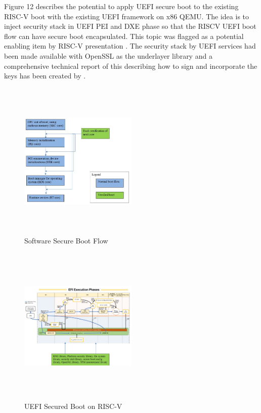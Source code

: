 \documentclass[a4paper,fleqn]{cas-dc}
\begin{document}
Figure 12 describes the potential to apply UEFI secure boot to the existing RISC-V boot with the existing UEFI framework on x86 QEMU. The idea is to inject security stack in UEFI PEI and DXE phase so that the RISCV UEFI boot flow can have secure boot encapsulated. This topic was flagged as a potential enabling item by RISC-V presentation \cite{R5:10}. The security stack by UEFI services had been made available with OpenSSL as the underlayer library and a comprehensive technical report of this describing how to sign and incorporate the keys has been created by \cite{R5:11}.

\begin{figure}[hbt!]
	\centering
	\includegraphics[width=0.5\textwidth,height=3in]{figs/SoftwareSecureBootFlow.JPG}
	\caption{Software Secure Boot Flow}
\end{figure}


\begin{figure}[hbt!]
	\centering
	\includegraphics[width=0.5\textwidth,height=3in]{figs/SecureBootOnRISCV.JPG}
	\caption{UEFI Secured Boot on RISC-V}
\end{figure}
\end{document}
